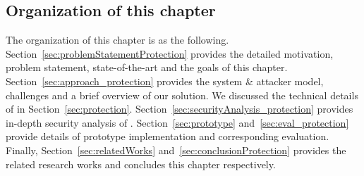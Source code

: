 \subsection{Organization of this chapter} The organization of this chapter is as the following. Section~\ref{sec:problemStatementProtection} provides the detailed motivation, problem statement, state-of-the-art and the goals of this chapter. Section~\ref{sec:approach_protection} provides the system \& attacker model, challenges and a brief overview of our solution. We discussed the technical details of \name in Section~\ref{sec:protection}. Section~\ref{sec:securityAnalysis_protection} provides in-depth security analysis of \name. Section~\ref{sec:prototype} and~\ref{sec:eval_protection} provide details of \name prototype implementation and corresponding evaluation. Finally, Section~\ref{sec:relatedWorks} and~\ref{sec:conclusionProtection} provides the related research works and concludes this chapter respectively.
